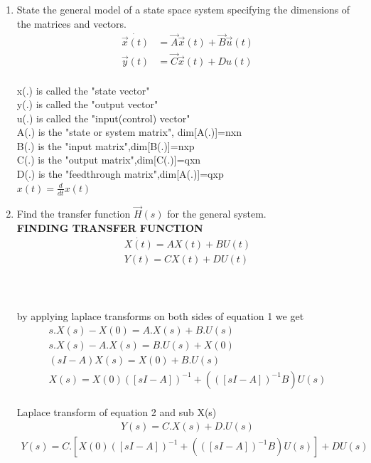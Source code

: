 \begin{enumerate}[label=\thesection.\arabic*.,ref=\thesection.\theenumi]
\item State the general model of a state space system specifying the dimensions of the matrices and vectors.
\\
\solution 
\begin{align*}
\dot{\vec{x}(t)}&=\vec{A}\vec{x}(t)+\vec{B}\vec{u}(t) \\
 \vec{y}(t)&=\vec{C}\vec{x}(t)+D u(t)
\end{align*}
\\ x(.) is called the "state vector"
\\ y(.) is called the "output vector"
\\ u(.) is called the "input(control) vector"
\\ A(.) is the "state or system matrix", dim[A(.)]=nxn
\\ B(.) is the "input matrix",dim[B(.)]=nxp
\\ C(.) is the "output matrix",dim[C(.)]=qxn
\\ D(.) is the "feedthrough matrix",dim[A(.)]=qxp
\\ $\dot{x(t)}=\frac{d}{dt}x(t)$
\\
\item Find the transfer function $\vec{H}(s)$ for the general system.
\solution
\\ \textbf{FINDING TRANSFER FUNCTION}
\begin{align*}
 \dot{X(t)}=AX(t)+BU(t) \\
 Y(t)=CX(t)+DU(t)
\end{align*} 
\\
\\   
\\by applying laplace transforms on both sides of equation 1
we get
\begin{align*}
s.X(s)-X(0)=A.X(s)+B.U(s) \\
s.X(s)-A.X(s)=B.U(s)+X(0) \\
(sI-A)X(s)=X(0)+B.U(s) \\
X(s)=X(0)([sI-A])^{-1}+(([sI-A])^{-1}B)U(s)
\end{align*}
\\Laplace transform of equation 2 and sub X(s) 
\begin{align*}
Y(s)=C.X(s)+D.U(s)
\end{align*}
\begin{align*}
Y(s)=C.[X(0)([sI-A])^{-1 }+ (([sI-A])^{-1}B)U(s)]+DU(s) 
\end{align*}

\end{enumerate}
